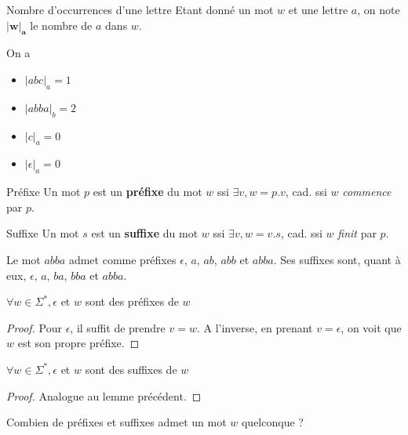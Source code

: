 \begin{definition}{Nombre d'occurrences d'une lettre}{}
Etant donné un mot $w$ et une lettre $a$, on note $\mathbf{|w|_a}$ le nombre de $a$ dans $w$.
\end{definition}

\begin{example}
On a 
\begin{itemize}
    \item $|abc|_a = 1$
    \item $|abba|_b = 2$
    \item $|c|_a = 0$
    \item $|\epsilon|_a = 0$
\end{itemize}
\end{example}

\begin{definition}{Préfixe}{}
Un mot $p$ est un \textbf{préfixe} du mot $w$ ssi $\exists v, w = p.v$, cad. ssi $w$ \textit{commence} par $p$.
\end{definition}

\begin{definition}{Suffixe}{}
Un mot $s$ est un \textbf{suffixe} du mot $w$ ssi $\exists v, w = v.s$, cad. ssi $w$ \textit{finit} par $p$.
\end{definition}

\begin{example}
Le mot $abba$ admet comme préfixes $\epsilon$, $a$, $ab$, $abb$ et $abba$. Ses suffixes sont, quant à eux, $\epsilon$, $a$, $ba$, $bba$ et $abba$.
\end{example}

\begin{lemma}
$\forall w \in \Sigma^*, \epsilon$ et $w$ sont des préfixes de $w$
\end{lemma}

\begin{proof}
Pour $\epsilon$, il suffit de prendre $v = w$. A l'inverse, en prenant $v = \epsilon$, on voit que $w$ est son propre préfixe.
\end{proof}

\begin{lemma}
$\forall w \in \Sigma^*, \epsilon$ et $w$ sont des suffixes de $w$
\end{lemma}

\begin{proof}
Analogue au lemme précédent.
\end{proof}


\begin{exercice}\label{expref}
Combien de préfixes et suffixes admet un mot $w$ quelconque ?
\end{exercice}

